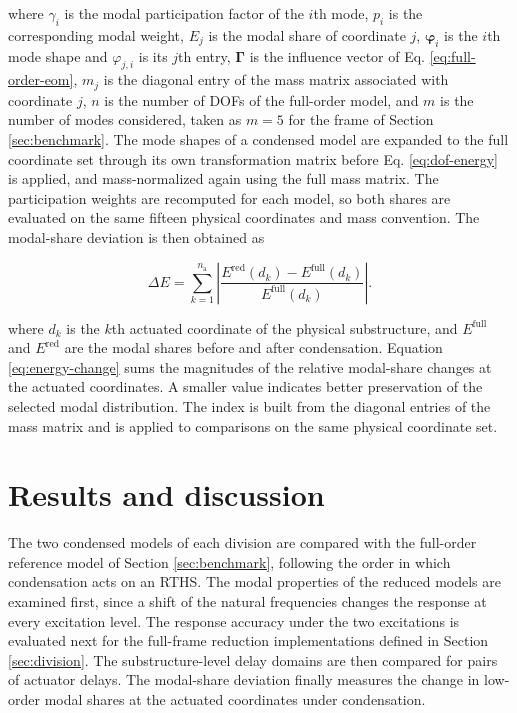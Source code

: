 \documentclass[a4paper,fleqn,review,12pt]{cas-sc}
\begin{document}
\noindent where \(\gamma_{i}\) is the modal participation factor of the \(i\)th mode, \(p_{i}\) is the corresponding modal weight, \(E_{j}\) is the modal share of coordinate \(j\), \(\bm{\varphi}_{i}\) is the \(i\)th mode shape and \(\varphi_{j,i}\) is its \(j\)th entry, \(\bm{\Gamma}\) is the influence vector of Eq. \eqref{eq:full-order-eom}, \(m_{j}\) is the diagonal entry of the mass matrix associated with coordinate \(j\), \(n\) is the number of DOFs of the full-order model, and \(m\) is the number of modes considered, taken as \(m=5\) for the frame of Section \ref{sec:benchmark}. The mode shapes of a condensed model are expanded to the full coordinate set through its own transformation matrix before Eq. \eqref{eq:dof-energy} is applied, and mass-normalized again using the full mass matrix. The participation weights are recomputed for each model, so both shares are evaluated on the same fifteen physical coordinates and mass convention. The modal-share deviation is then obtained as

\vspace{-3.5em}
\begin{equation}
	\Delta E=\sum_{k=1}^{n_{\mathrm{a}}}
	\left|\frac{E^{\mathrm{red}}(d_{k})-E^{\mathrm{full}}(d_{k})}{E^{\mathrm{full}}(d_{k})}\right|.
	\label{eq:energy-change}
\end{equation}
\vspace{-3.5em}

\noindent where \(d_{k}\) is the \(k\)th actuated coordinate of the physical substructure, and \(E^{\mathrm{full}}\) and \(E^{\mathrm{red}}\) are the modal shares before and after condensation. Equation \eqref{eq:energy-change} sums the magnitudes of the relative modal-share changes at the actuated coordinates. A smaller value indicates better preservation of the selected modal distribution. The index is built from the diagonal entries of the mass matrix and is applied to comparisons on the same physical coordinate set.




\section{Results and discussion} \label{sec5}

The two condensed models of each division are compared with the full-order reference model of Section \ref{sec:benchmark}, following the order in which condensation acts on an RTHS. The modal properties of the reduced models are examined first, since a shift of the natural frequencies changes the response at every excitation level. The response accuracy under the two excitations is evaluated next for the full-frame reduction implementations defined in Section \ref{sec:division}. The substructure-level delay domains are then compared for pairs of actuator delays. The modal-share deviation finally measures the change in low-order modal shares at the actuated coordinates under condensation.
\end{document}
